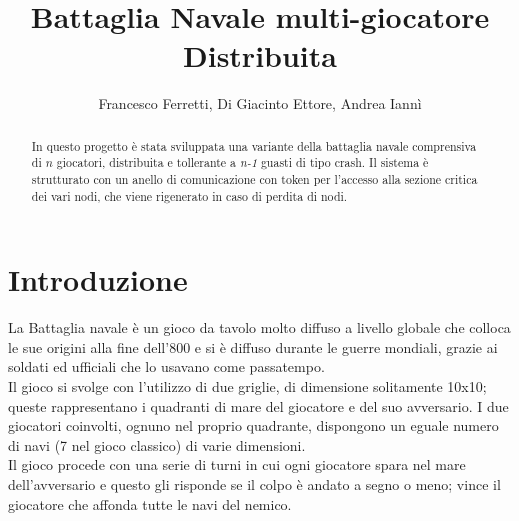 \documentclass{llncs}
\begin{document}
%
\frontmatter          %
%
\pagestyle{headings}  %

%
\mainmatter              %
%
\title{Battaglia Navale multi-giocatore Distribuita}
%
%
\author{Francesco Ferretti, Di Giacinto Ettore, Andrea Iannì}
%
%
%

\maketitle              %

\begin{abstract}
In questo progetto è stata sviluppata una variante della battaglia navale comprensiva di $n$ giocatori, distribuita e tollerante a \emph{n-1} guasti di tipo crash. Il sistema è strutturato con un anello di comunicazione con token per l'accesso alla sezione critica dei vari nodi, che viene rigenerato in caso di perdita di nodi.
\end{abstract}

\section{Introduzione}
La Battaglia navale è un gioco da tavolo molto diffuso a livello globale che colloca le sue origini alla fine dell'800 e si è diffuso durante le guerre mondiali, grazie ai soldati ed ufficiali che lo usavano come passatempo.\\
Il gioco si svolge con l'utilizzo di due griglie, di dimensione solitamente 10x10; queste rappresentano i quadranti di mare del giocatore e del suo avversario. I due giocatori coinvolti, ognuno nel proprio quadrante, dispongono un eguale numero di navi (7 nel gioco classico) di varie dimensioni.\\
Il gioco procede con una serie di turni in cui ogni giocatore spara nel mare dell'avversario e questo gli risponde se il colpo è andato a segno o meno; vince il giocatore che affonda tutte le navi del nemico.
\end{document}
